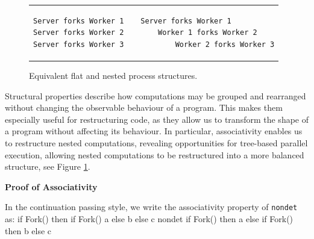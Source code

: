\documentclass[logo,bsc,singlespacing,parskip]{infthesis}
\begin{document}
\vspace{-1em} %
\begin{figure}[H]
    \centering
    \begin{tabular}{p{} c p{}}
        \begin{lstlisting}
Server forks Worker 1
Server forks Worker 2
Server forks Worker 3
        \end{lstlisting}
        &
        &
        \begin{lstlisting}
Server forks Worker 1
    Worker 1 forks Worker 2
        Worker 2 forks Worker 3
        \end{lstlisting}
    \end{tabular}
    \vspace{-1em} %

    \caption{Equivalent flat and nested process structures.}
    \label{fig:process-restructuring}
\end{figure}

Structural properties describe how computations may be grouped and rearranged without changing the observable behaviour of a program. This makes them especially useful for restructuring code, as they allow us to transform the shape of a program without affecting its behaviour. In particular, associativity enables us to restructure nested computations, revealing opportunities for tree-based parallel execution, allowing nested computations to be restructured into a more balanced structure, see Figure  \ref{fig:process-restructuring}.



\vspace{1em}
\textbf{\large{Proof of Associativity}}

In the continuation passing style, we  write the associativity property of \lstinline{nondet} as:
{
if Fork() then
if Fork() 
a 
else 
b 
else 
c
}
{nondet}
{
if Fork() then a 
else 
if Fork() 
 then b 
 else c
}
\end{document}
